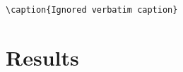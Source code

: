
\begin{verbatim}

\caption{Ignored verbatim caption}
\end{verbatim}

\begin{abstract}
The bit error rate (BER) was measured. BER remained below the target threshold.
\end{abstract}

\section{Results}
\caption[Short entry]{Measured {bit error rate} versus
received power for two streams; circles denote stream one and squares denote stream two.}

\newcommand{\mycap}[1]{\caption{#1}}
\mycap{Custom BER result}

